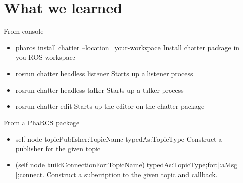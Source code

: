 \documentclass[a4paper,10pt,twoside]{book}
\begin{document}
			\section{What we learned}
			
				From console
				
				\begin{itemize}
					\item pharos install chatter --location={your-workspace}
						\newline \-\- Install chatter package in you ROS workspace
					\item rosrun chatter headless listener
						\newline \-\- Starts up a listener process
					\item rosrun chatter headless talker
						\newline \-\- Starts up a talker process
					\item rosrun chatter edit
						\newline \-\- Starts up the editor on the chatter package
				\end{itemize}
				
				From a PhaROS package 
				
				\begin{itemize}
					\item self node topicPublisher:{TopicName} typedAs:{TopicType}
						\newline \-\- Construct a publisher for the given topic
					\item (self node buildConnectionFor:{TopicName}) typedAs:{TopicType};for:[:aMsg ];connect.
						\newline \-\- Construct a subscription to the given topic and callback.
				\end{itemize}
			
			


\ifx\wholebook\relax\else
\end{document}
